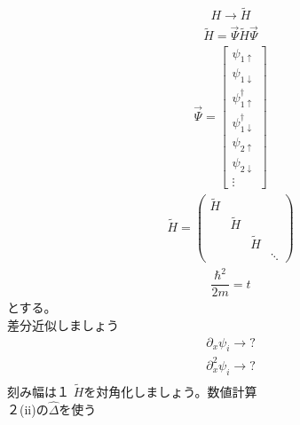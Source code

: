 \documentclass{jarticle}
\begin{document}
\begin{align}
 H\rightarrow \tilde{H}
\end{align}
\begin{align}
  \tilde{H}=\vec{\Psi}\tilde{H}\vec{\Psi}
 \end{align}
 \begin{align}
  \vec{\Psi}=\begin{bmatrix}
  \psi_{1\uparrow} \\ 
  \psi_{1\downarrow} \\ 
  \psi_{1\uparrow}^\dagger \\ 
  \psi_{1\downarrow}^\dagger\\
  \psi_{2\uparrow} \\ 
  \psi_{2\downarrow} \\ 
  \vdots
 \end{bmatrix}
\end{align}
\begin{align}
\tilde{H}=
\begin{pmatrix}
\tilde{H} &  &  &  \\ 
& \tilde{H} &  &  \\ 
&  & \tilde{H} &  \\ 
&  &  & \ddots
\end{pmatrix} 
\end{align}
\begin{align}
\dfrac{\hbar^2}{2m}=t
\end{align}
とする。\\
差分近似しましょう\\
\begin{align}
\partial_x \psi_i\rightarrow?\\
\partial^2_x \psi_i\rightarrow?\\
\end{align}
刻み幅は１
$\tilde{H}$を対角化しましょう。数値計算\\
２(ii)の$\hat{\Delta}$を使う\\
\end{document}
